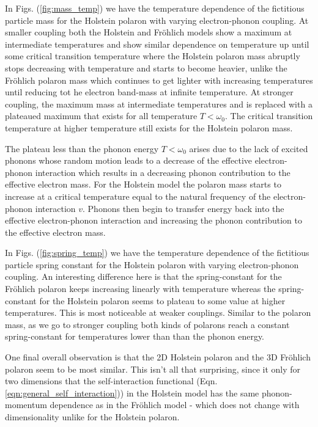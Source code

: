 In Figs. (\ref{fig:mass_temp}) we have the temperature dependence of the fictitious particle mass for the Holstein polaron with varying electron-phonon coupling. At smaller coupling both the Holstein and Fr\"ohlich models show a maximum at intermediate temperatures and show similar dependence on temperature up until some critical transition temperature where the Holstein polaron mass abruptly stops decreasing with temperature and starts to become heavier, unlike the Fr\"ohlich polaron mass which continues to get lighter with increasing temperatures until reducing tot he electron band-mass at infinite temperature. At stronger coupling, the maximum mass at intermediate temperatures and is replaced with a plateaued maximum that exists for all temperature $T < \omega_0$. The critical transition temperature at higher temperature still exists for the Holstein polaron mass.
\newline

The plateau less than the phonon energy $T < \omega_0$ arises due to the lack of excited phonons whose random motion leads to a decrease of the effective electron-phonon interaction which results in a decreasing phonon contribution to the effective electron 
mass. For the Holstein model the polaron mass starts to increase at a critical temperature equal to the natural frequency of the electron-phonon interaction $v$. Phonons then begin to transfer energy back into the effective electron-phonon interaction and increasing the phonon contribution to the effective electron mass.
\newline

In Figs. (\ref{fig:spring_temp}) we have the temperature dependence of the fictitious particle spring constant for the Holstein polaron with varying electron-phonon coupling. An interesting difference here is that the spring-constant for the Fr\"ohlich polaron keeps increasing linearly with temperature whereas the spring-constant for the Holstein polaron seems to plateau to some value at higher temperatures. This is most noticeable at weaker couplings. Similar to the polaron mass, as we go to stronger coupling both kinds of polarons reach a constant spring-constant for temperatures lower than than the phonon energy.
\newline

One final overall observation is that the 2D Holstein polaron and the 3D Fr\"ohlich polaron seem to be most similar. This isn't all that surprising, since it only for two dimensions that the self-interaction functional (Eqn. \ref{eqn:general_self_interaction})) in the Holstein model has the same phonon-momentum dependence as in the Fr\"ohlich model - which does not change with dimensionality unlike for the Holstein polaron.

